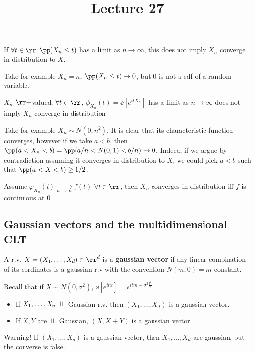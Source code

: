 \documentclass[../main.tex]{subfiles}
\title{Lecture 27}
\begin{document}
\begin{obs}
  If $\forall t \in \rr$ $\pp(X_n \leq t)$ has a limit as $n \to \infty$, this
  does \underline{not} imply $X_n$ converge in distribution to $X$.

  Take for example $X_n = n$, $\pp(X_n \leq t) \to 0$, but $0$ is not a cdf of
  a random variable.
\end{obs}
\begin{obs}
  $X_n$ $\rr-$valued, $\forall t \in \rr$, $\phi_{X_n}(t) = \ee[e^{itX_n}]$ has
  a limit as $n \to \infty$ does not imply $X_n$ converge in distribution

  Take for example $X_n \sim N(0, n^2)$. It is clear that its characteristic
  function converges, however if we take $a < b$, then $\pp(a < X_n < b) =
  \pp(a/n < N(0, 1) < b/n) \to 0$. Indeed, if we argue by contradiction assuming
  it converges in distribution to $X$, we could pick $a < b$ such that $\pp(a <
  X < b) \geq 1/2$.
\end{obs}
\begin{remark}
  Assume $\varphi_{X_n}(t) \underset{n \to \infty}{\longrightarrow} f(t)$ $\forall
  t \in \rr$, then $X_n$ converges in distribution iff $f$ is continuous at $0$.
\end{remark}

\subsection{Gaussian vectors and the multidimensional CLT}
\begin{definition}
  A r.v. $X = (X_1, \ldots, X_d) \in \rr^d$ is a \textbf{gaussian vector} if any
  linear combination of its cordinates is a gaussian r.v with the convention
  $N(m, 0) = m$ constant.
\end{definition}

Recall that if $X \sim N(0, \sigma^2)$, $\ee[e^{itx}] = e^{itm - \sigma^2
\frac{t^2}{2}} $.

\begin{example}
    \hfill
    \begin{itemize}
      \item If $X_1, \ldots, X_n \perp\!\!\!\!\,\perp$ Gaussian r.v. then $(X_1,\ldots,X_d)$
        is a gaussian vector.
      \item If $X, Y$ are $\perp\!\!\!\!\,\perp$ Gaussian, $(X, X+Y)$ is a gaussian vector
    \end{itemize}
\end{example}
{\color{red} Warning!} If $(X_1, \ldots, X_d)$ is a gaussian vector, then $X_1,
\ldots, X_d$ are gaussian, but the converse is false.
\end{document}

